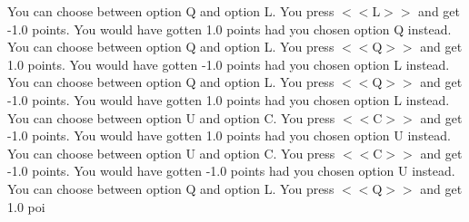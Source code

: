 \documentclass[pdflatex,sn-nature]{sn-jnl}%
\theoremstyle{thmstyleone}%
\theoremstyle{thmstyletwo}%
\theoremstyle{thmstylethree}%
\begin{document}
You can choose between option Q and option L. You press $<<$L$>>$ and get -1.0 points. You would have gotten 1.0 points had you chosen option Q instead.  $~$\\ 
You can choose between option Q and option L. You press $<<$Q$>>$ and get 1.0 points. You would have gotten -1.0 points had you chosen option L instead.  $~$\\ 
You can choose between option Q and option L. You press $<<$Q$>>$ and get -1.0 points. You would have gotten 1.0 points had you chosen option L instead.  $~$\\ 
You can choose between option U and option C. You press $<<$C$>>$ and get -1.0 points. You would have gotten 1.0 points had you chosen option U instead.  $~$\\ 
You can choose between option U and option C. You press $<<$C$>>$ and get -1.0 points. You would have gotten -1.0 points had you chosen option U instead.  $~$\\ 
You can choose between option Q and option L. You press $<<$Q$>>$ and get 1.0 poi 
\end{document}
